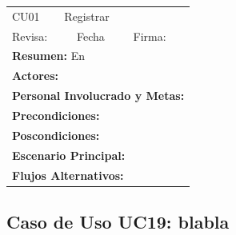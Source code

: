 \begin{longtable}{|l|p{5.5cm}|l|p{2cm}|l|p{1.9cm}|} \hline
    \cellcolor{grisOscuro} CU01 & \multicolumn{4}{|l|}{  \cellcolor{grisOscuro} Registrar} &  \cellcolor{grisClaro}\multirow{2}{1cm}{} \\ \cline{1-5}
    \cellcolor{grisOscuro} Revisa: &  \cellcolor{grisClaro} &  \cellcolor{grisOscuro} Fecha &  \cellcolor{grisClaro} &  \cellcolor{grisOscuro} Firma: & \cellcolor{grisClaro} \\ \hline
    \multicolumn{6}{|p{15cm}|}{ \textbf{Resumen: } En

    } \\ \hline

    \multicolumn{6}{|p{15cm}|}{ \textbf{Actores: }

    } \\ \hline

    \multicolumn{6}{|p{15cm}|}{ \textbf{Personal Involucrado y Metas: }

    } \\ \hline

    \multicolumn{6}{|p{15cm}|}{ \textbf{Precondiciones: }

    } \\ \hline

    \multicolumn{6}{|p{15cm}|}{ \textbf{Poscondiciones: }

    } \\ \hline

    \multicolumn{6}{|p{15cm}|}{ \textbf{Escenario Principal: }

    } \\ \hline

    \multicolumn{6}{|p{15cm}|}{ \textbf{Flujos Alternativos: }

    } \\ \hline

\end{longtable}


\subsection{Caso de Uso UC19: blabla}

